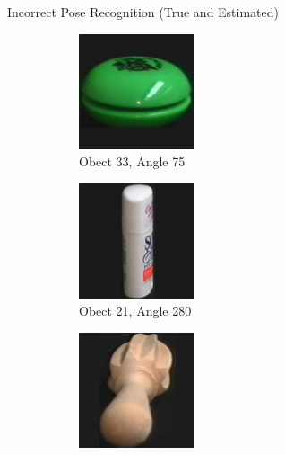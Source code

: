 \documentclass[aspectratio=169, handout, 10pt, hyperref=colorlinks]{beamer}
\begin{document}
\begin{frame}{Incorrect Pose Recognition (True and Estimated)}
    \begin{figure}
        \centering
        \begin{subfigure}{0.32\linewidth}
            \centering
            \includegraphics[width = 0.6\linewidth]{incorrect/obj34__75.png}
            \vspace{1em}
            \caption{Obect 33, Angle 75}
        \end{subfigure}
        \begin{subfigure}{0.32\linewidth}
            \centering
            \includegraphics[width = 0.6\linewidth]{incorrect/obj22__280.png}
            \vspace{1em}
            \caption{Obect 21, Angle 280}
        \end{subfigure}
        \begin{subfigure}{0.32\linewidth}
            \centering
            \includegraphics[width = 0.6\linewidth]{incorrect/obj21__100.png}

\end{subfigure}
\end{figure}
\end{frame}
\end{document}
